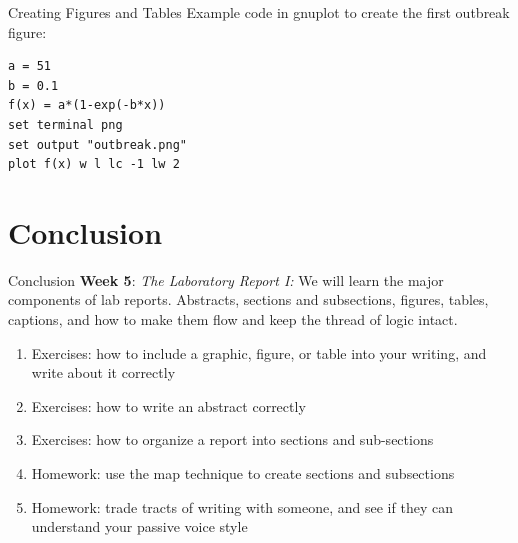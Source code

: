 \documentclass{beamer}
\begin{document}
\begin{frame}[fragile]{Creating Figures and Tables}
\small
Example code in gnuplot to create the first outbreak figure:
\begin{verbatim}
a = 51
b = 0.1
f(x) = a*(1-exp(-b*x))
set terminal png
set output "outbreak.png"
plot f(x) w l lc -1 lw 2
\end{verbatim}
\end{frame}

\section{Conclusion}

\begin{frame}{Conclusion}
\small
\textbf{Week 5}: \textit{The Laboratory Report I:} We will learn the major components of lab reports.  Abstracts, sections and subsections, figures, tables, captions, and how to make them flow and keep the thread of logic intact.
\begin{enumerate}
\item Exercises: how to include a graphic, figure, or table into your writing, and write about it correctly
\item Exercises: how to write an abstract correctly
\item Exercises: how to organize a report into sections and sub-sections
\item Homework: use the map technique to create sections and subsections
\item Homework: trade tracts of writing with someone, and see if they can understand your passive voice style
\end{enumerate}
\end{frame}
\end{document}
